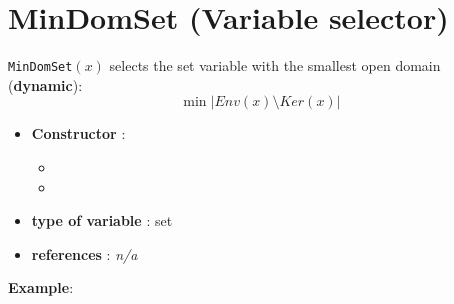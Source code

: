 \section{MinDomSet (Variable selector)}\label{mindomset:mindomsetvarselector}\hypertarget{mindomset:mindomsetvarselector}{}
\begin{notedef}
  \texttt{MinDomSet}$(x)$ selects the set variable with the smallest open domain (\textbf{dynamic}):
$$\min |Env(x)\setminus Ker(x)|$$
\end{notedef}

\begin{itemize}
	\item \textbf{Constructor} : 
	\begin{itemize}
	\item {}
	\item {}
	\end{itemize}	
	\item \textbf{type of variable} : set
	\item \textbf{references} : \emph{n/a}
\end{itemize}

\textbf{Example}:
%

